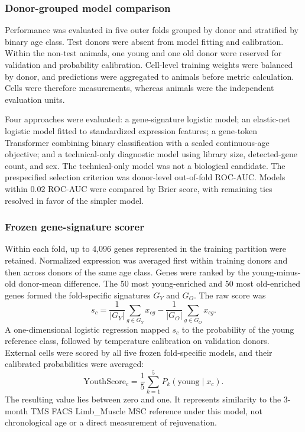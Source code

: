 \documentclass[10pt,twocolumn]{article}
\begin{document}
\subsubsection{Donor-grouped model comparison}

Performance was evaluated in five outer folds grouped by donor and stratified by binary age class. Test donors were absent from model fitting and calibration. Within the non-test animals, one young and one old donor were reserved for validation and probability calibration. Cell-level training weights were balanced by donor, and predictions were aggregated to animals before metric calculation. Cells were therefore measurements, whereas animals were the independent evaluation units.

Four approaches were evaluated: a gene-signature logistic model; an elastic-net logistic model fitted to standardized expression features; a gene-token Transformer combining binary classification with a scaled continuous-age objective; and a technical-only diagnostic model using library size, detected-gene count, and sex. The technical-only model was not a biological candidate. The prespecified selection criterion was donor-level out-of-fold ROC-AUC. Models within 0.02 ROC-AUC were compared by Brier score, with remaining ties resolved in favor of the simpler model.

\subsubsection{Frozen gene-signature scorer}

Within each fold, up to 4,096 genes represented in the training partition were retained. Normalized expression was averaged first within training donors and then across donors of the same age class. Genes were ranked by the young-minus-old donor-mean difference. The 50 most young-enriched and 50 most old-enriched genes formed the fold-specific signatures $G_Y$ and $G_O$. The raw score was
\begin{equation}
s_c=\frac{1}{|G_Y|}\sum_{g\in G_Y}x_{cg}
-\frac{1}{|G_O|}\sum_{g\in G_O}x_{cg}.
\end{equation}
A one-dimensional logistic regression mapped $s_c$ to the probability of the young reference class, followed by temperature calibration on validation donors. External cells were scored by all five frozen fold-specific models, and their calibrated probabilities were averaged:
\begin{equation}
\mathrm{YouthScore}_c=\frac{1}{5}\sum_{k=1}^{5}P_k(\mathrm{young}\mid x_c).
\end{equation}
The resulting value lies between zero and one. It represents similarity to the 3-month TMS FACS Limb\_Muscle MSC reference under this model, not chronological age or a direct measurement of rejuvenation.
\end{document}
